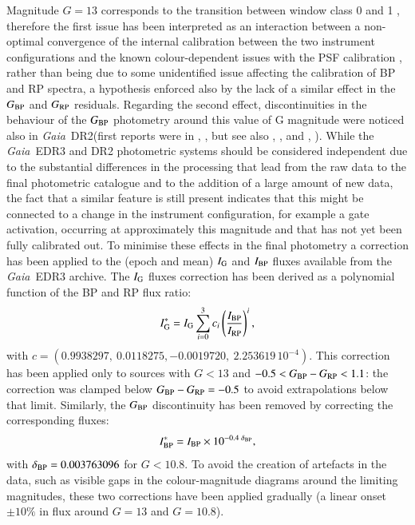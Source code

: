 \documentclass{aa}
\newcommand{\gaia}{\textit{Gaia}\xspace}
\newcommand{\gbp}{\ensuremath{G_{\rm BP}}\xspace}
\newcommand{\grp}{\ensuremath{G_{\rm RP}}\xspace}
\newcommand{\bprp}{\ensuremath{G_{\rm BP}-G_{\rm RP}}\xspace}
\newcommand{\gflux}{\ensuremath{I_{\rm G}}\xspace}
\newcommand{\bpflux}{\ensuremath{I_{\rm BP}}\xspace}
\newcommand{\rpflux}{\ensuremath{I_{\rm RP}}\xspace}
\newcommand{\drt}{\gaia~DR2\xspace}
\newcommand{\edr}{\gaia~EDR3\xspace}
\newcommand{\xp}{BP and RP\xspace}
\begin{document}
Magnitude $G=13$ corresponds to the transition between window class 0 and 1 \citep{GaiaRef}, therefore the first issue has been interpreted as an interaction between a non-optimal convergence of the internal calibration between the two instrument configurations
and the known colour-dependent issues with the PSF calibration \citep{EDR3_PSF}, rather than being due to some unidentified issue affecting the calibration of \xp spectra, a hypothesis enforced also by the lack of a similar effect in the \gbp and \grp residuals.
Regarding the second effect, discontinuities in the behaviour of the \gbp photometry around this value of G magnitude were noticed also in \drt (first reports were in \citeauthor{arenou2018}, \citeyear{arenou2018}, but see also \citeauthor{Weiler2018}, \citeyear{Weiler2018}, and  \citeauthor{Maizap}, \citeyear{Maizap}). While the \edr and DR2 photometric systems should be considered independent due to the substantial differences in the processing that lead from the raw data to the final photometric catalogue and to the addition of a large amount of new data, the fact that a similar feature is still present indicates that this might be connected to a change in the instrument configuration, for example a gate activation, occurring at approximately this magnitude and that has not yet been fully calibrated out.
To minimise these effects in the final photometry a correction has been applied to the (epoch and mean) \gflux and \bpflux fluxes available from the \edr archive.
The \gflux fluxes correction has been derived as a polynomial function of the \xp flux ratio:
%
\begin{equation}
\label{gfluxcorr}
\gflux^* = \gflux \sum_{i=0}^{3} c_i \left(\frac{\bpflux}{\rpflux}\right)^i,
\end{equation}
%
with  $c = (0.9938297, ~0.0118275, -0.0019720, ~2.253619\,10^{-4})$. This correction has been applied only to sources with $G < 13$ and $-0.5 < \bprp < 1.1$: the correction was clamped below $\bprp = -0.5$ to avoid extrapolations below that limit.
Similarly, the \gbp discontinuity has been removed by correcting the corresponding fluxes:
%
\begin{equation}
\label{ }
\bpflux^* = \bpflux \times 10^{-0.4\; \delta_{\rm BP}},
\end{equation}
%
with  $\delta_{\rm BP} =  0.003763096$ for $G < 10.8$.
To avoid the creation of artefacts in the data, such as visible gaps in the colour-magnitude diagrams around the limiting magnitudes, these two corrections have been applied gradually (a linear onset $\pm10\%$ in flux around $G = 13$ and $G = 10.8$).
\end{document}
